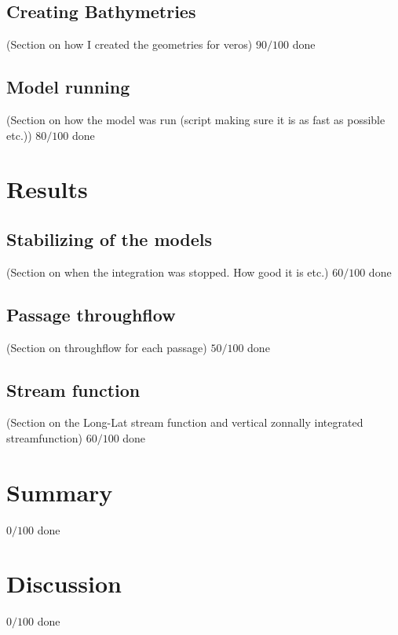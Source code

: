 \documentclass[a4paper]{article}
\begin{document}
\begin{multicols}{2}
\subsection{Creating Bathymetries}

(Section on how I created the geometries for veros)
$90/100$ done
%

\subsection{Model running}

(Section on how the model was run (script making sure it is as fast as possible etc.))
%
$80/100$ done
\section{Results}
\subsection{Stabilizing of the models}
(Section on when the integration was stopped. How good it is etc.)
$60/100$ done


\subsection{Passage throughflow}
(Section on throughflow for each passage)
$50/100$ done

\subsection{Stream function}

(Section on the Long-Lat stream function and vertical zonnally integrated streamfunction)
$60/100$ done
\section{Summary}
%
$0/100$ done

\section{Discussion}
%
$0/100$ done


%

\printbibliography

\end{multicols}
\end{document}
